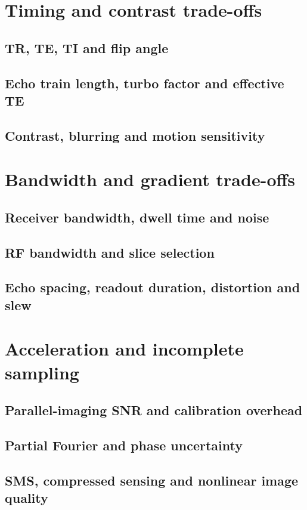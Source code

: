 \section{Timing and contrast trade-offs}
\label{sec:24:timing-and-contrast-trade-offs}
\subsection{TR, TE, TI and flip angle}
\subsection{Echo train length, turbo factor and effective TE}
\subsection{Contrast, blurring and motion sensitivity}

\section{Bandwidth and gradient trade-offs}
\label{sec:24:bandwidth-and-gradient-trade-offs}
\subsection{Receiver bandwidth, dwell time and noise}
\subsection{RF bandwidth and slice selection}
\subsection{Echo spacing, readout duration, distortion and slew}

\section{Acceleration and incomplete sampling}
\label{sec:24:acceleration-and-incomplete-sampling}
\subsection{Parallel-imaging SNR and calibration overhead}
\subsection{Partial Fourier and phase uncertainty}
\subsection{SMS, compressed sensing and nonlinear image quality}

